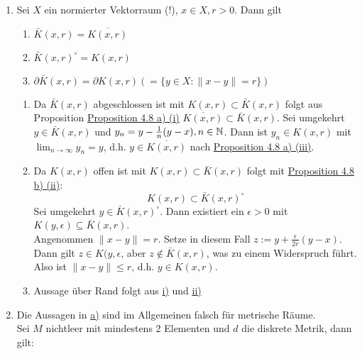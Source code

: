 \begin{beispiel} \label{bsp:1-4.11}
	\begin{enumerate}[label=\alph*\upshape)]
		\item \label{bsp:1-4.11.a} Sei $X$ ein normierter Vektorraum (!), $x \in X, r > 0$. Dann gilt
			\begin{enumerate}
				\item $\bar K(x, r) = \overline{K(x, r)}$ \label{bsp:1-4.11.a.i}
				\item $\bar K(x, r)^{\circ} = K(x, r)$ \label{bsp:1-4.11.a.ii}
				\item $\partial \bar K(x, r) = \partial K(x, r) (= \{ y \in X: \| x - y \| = r \} ) $	\label{bsp:1-4.11.a.iii}
			\end{enumerate}
			\begin{beweis}
				\begin{enumerate}
					\item Da $ \bar K(x, r)$ abgeschlossen ist mit $K(x, r) \subset \bar K(x, r)$ folgt aus Proposition \hyperref[prop:1-4.8.a1]{Proposition 4.8  a) (i)} $\overline{K(x, r)} \subset \bar K(x, r)$.
						Sei umgekehrt $y \in \bar K(x, r)$ und $y_{n} = y - \frac{1}{n} (y - x), n \in \mathbb{N}$. Dann ist $y_{n} \in K(x, r)$ mit $\lim_{n \rightarrow \infty} y_{n} = y$, d.h. $y \in \overline{K(x, r)}$ nach \hyperref[prop:1-4.8.a3]{Proposition 4.8 a) (iii)}.
					\item Da $K(x, r)$ offen ist mit $K(x, r) \subset \bar K(x, r)$ folgt mit \hyperref[prop:1-4.8.b2]{Proposition 4.8 b) (ii)}: 
						\[ K(x, r) \subset \bar K(x, r)^{\circ} \]
						Sei umgekehrt $y \in \bar K(x, r)^{\circ}$. Dann existiert ein $\epsilon > 0$ mit $K(y, \epsilon) \subseteq \bar K(x, r)$. \\
						Angenommen $\| x - y \| = r$. Setze in diesem Fall $z := y + \frac{\epsilon}{2 r} (y - x)$. Dann gilt $z \in K(y, \epsilon$, aber $z \notin \bar K(x, r)$, was zu einem Widerspruch führt. \\
						Also ist $\| x - y \| \leq r$, d.h. $y \in K(x, r)$.
					\item Aussage über Rand folgt aus \hyperref[bsp:1-4.11.a.i]{i)} und \hyperref[bsp:1-4.11.a.ii]{ii)}		
				\end{enumerate}
			\end{beweis}
		\item Die Aussagen in \hyperref[bsp:1-4.11.a]{a)} sind im Allgemeinen falsch für metrische Räume. \\
			Sei $M$ nichtleer mit mindestens 2 Elementen und $d$ die diskrete Metrik, dann gilt:

\end{enumerate}
\end{beispiel}
